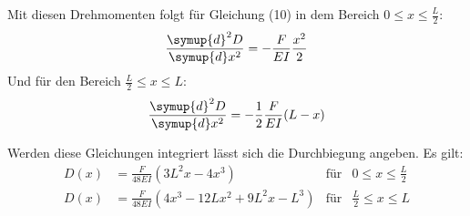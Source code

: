 Mit diesen Drehmomenten folgt für Gleichung (10) in dem Bereich $0 \leq x \leq \frac{L}{2}$:
\begin{equation}
  \frac{\symup{d}^2 D}{\symup{d} x^2} = - \frac{F}{EI}\frac{x^2}{2}
\end{equation}
Und für den Bereich $\frac{L}{2} \leq x \leq L$:
\begin{equation}
  \frac{\symup{d}^2 D}{\symup{d} x^2} = -\frac{1}{2} \frac{F}{EI}(L - x)
\end{equation}

Werden diese Gleichungen integriert lässt sich die Durchbiegung angeben. Es gilt:
\begin{align}
  D(x) &= \frac{F}{48EI} \left(3L^2x -4x^3 \right)   &\text{für}   &0 \leq x \leq \frac{L}{2} \\
  D(x) &= \frac{F}{48EI} \left(4x^3 -12Lx^2 + 9L^2x - L^3 \right)  &\text{für}   &\frac{L}{2} \leq x \leq L
\end{align}
